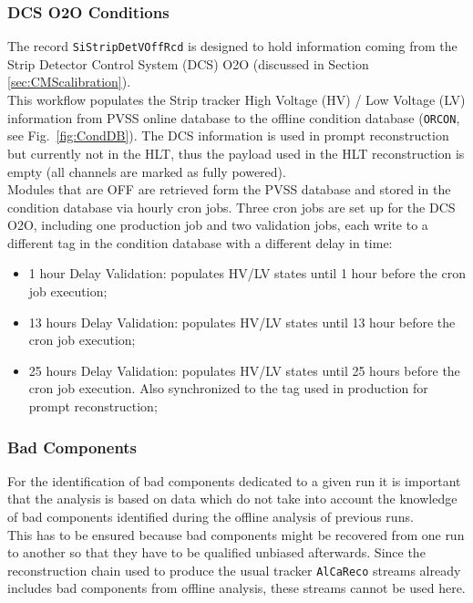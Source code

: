 \subsubsection{DCS O2O Conditions}
The record \texttt{SiStripDetVOffRcd} is designed to hold information coming from the Strip Detector Control System (DCS) O2O (discussed in Section \ref{sec:CMScalibration}).\\ This workflow populates the Strip tracker High Voltage (HV) / Low Voltage (LV) information from PVSS online database to the offline condition database (\texttt{ORCON}, see Fig.~\ref{fig:CondDB}). The DCS information is used in prompt reconstruction but currently not in the HLT, thus the payload used in the HLT reconstruction is empty (all channels are marked as fully powered).\\
Modules that are OFF are retrieved form the PVSS database and stored in the condition database via hourly cron jobs. Three cron jobs are set up for the DCS O2O, including one production job and two validation jobs, each write to a different tag in the condition database with a different delay in time: 
\begin{itemize}
\item 1 hour Delay Validation: populates HV/LV states until 1 hour before the cron job execution;
\item 13 hours Delay Validation: populates HV/LV states until 13 hour before the cron job execution;
\item 25 hours Delay Validation: populates HV/LV states until 25 hours before the cron job execution. Also synchronized to the tag used in production for prompt reconstruction;
\end{itemize}

\subsubsection{Bad Components}
For the identification of bad components dedicated to a given run it is important that the analysis is based on data which do not take into account the knowledge of bad components identified during the offline analysis of previous runs.\\
This has to be ensured because bad components might be recovered from one run to another so that they have to be qualified unbiased afterwards. Since the reconstruction chain used to produce the usual tracker \texttt{AlCaReco} streams already includes bad components from offline analysis, these streams cannot be used here.

